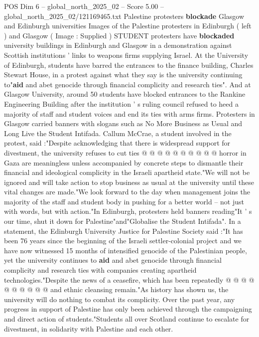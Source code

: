 \begin{textsample}{POS Dim 6 – global\_north\_2025\_02 – Score 5.00 – global\_north\_2025\_02/121169465.txt}  \label{ex:f6_pos_364}
Palestine protesters \textbf{blockade} Glasgow and Edinburgh universities Images of the Palestine protesters in Edinburgh ( left ) and Glasgow ( Image : Supplied ) STUDENT protesters have \textbf{blockaded} university buildings in Edinburgh and Glasgow in a demonstration against Scottish institutions ' links to weapons firms supplying Israel.
At the University of Edinburgh, students have barred the entrances to the finance building, Charles Stewart House, in a protest against what they say is the university continuing to"\textbf{aid} and abet genocide through financial complicity and research ties".
And at Glasgow University, around 50 students have blocked entrances to the Rankine Engineering Building after the institution ' s ruling council refused to heed a majority of staff and student voices and end its ties with arms firms.
Protesters in Glasgow carried banners with slogans such as No More Business as Usual and Long Live the Student Intifada.
Callum McCrae, a student involved in the protest, said :"Despite acknowledging that there is widespread support for divestment, the university refuses to cut ties @ @ @ @ @ @ @ @ @ @ horror in Gaza are meaningless unless accompanied by concrete steps to dismantle their financial and ideological complicity in the Israeli apartheid state."We will not be ignored and will take action to stop business as usual at the university until these vital changes are made."We look forward to the day when management joins the majority of the staff and student body in pushing for a better world -- not just with words, but with action."In Edinburgh, protesters held banners reading"It ' s our time, shut it down for Palestine"and"Globalise the Student Intifada".
In a statement, the Edinburgh University Justice for Palestine Society said :"It has been 76 years since the beginning of the Israeli settler-colonial project and we have now witnessed 15 months of intensified genocide of the Palestinian people, yet the university continues to \textbf{aid} and abet genocide through financial complicity and research ties with companies creating apartheid technologies."Despite the news of a ceasefire, which has been repeatedly @ @ @ @ @ @ @ @ @ @ and ethnic cleansing remain."As history has shown us, the university will do nothing to combat its complicity.
Over the past year, any progress in support of Palestine has only been achieved through the campaigning and direct action of students."Students all over Scotland continue to escalate for divestment, in solidarity with Palestine and each other.

\end{textsample}
